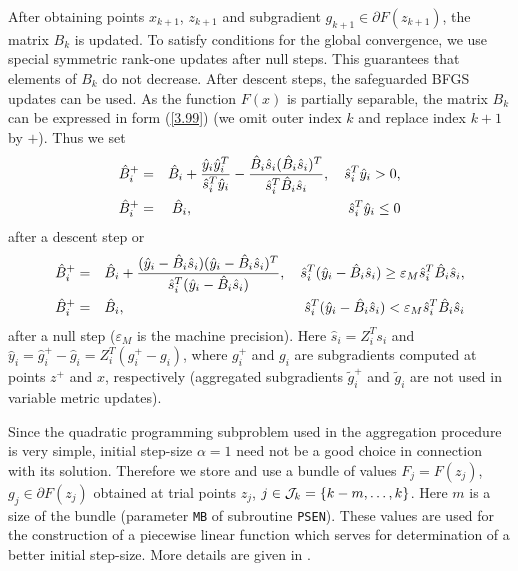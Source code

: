 \documentclass{esub2acm}
\newcommand{\beq}{\begin{eqnarray*}}
\newcommand{\eeq}{\end{eqnarray*}}
\begin{document}
After obtaining points $x_{k+1}$, $z_{k+1}$ and subgradient
$g_{k+1} \in \partial F(z_{k+1})$, the matrix $B_k$ is
updated. To satisfy conditions for the global convergence,
we use special symmetric rank-one updates after null steps.
This guarantees that elements of $B_k$ do not decrease. After
descent steps, the safeguarded BFGS updates can be used.
As the function $F(x)$ is partially separable, the matrix $B_k$
can be expressed in form (\ref{3.99}) (we omit outer
index $k$ and replace index $k+1$ by $+$). Thus we set
%
\beq
\label{4.7} \hat{B}_i^+ & = & \hat{B}_i + \frac{\hat{y}_i \hat{y}_i^T}{\hat{s}_i^T \hat{y}_i} -
\frac{\hat{B}_i \hat{s}_i (\hat{B}_i  \hat{s}_i)^T}{\hat{s}_i^T \hat{B}_i \hat{s}_i},
\quad  \hat{s}_i^T \hat{y}_i > 0, \\
\hat{B}_i^+ & = & \hat{B}_i, \hspace{39mm} \hat{s}_i^T \hat{y}_i \leq 0 \nonumber
\eeq
%
after a descent step or
%
\beq
\label{4.7a}
\hat{B}_i^+ & = & \hat{B}_i + \frac{(\hat{y}_i - \hat{B}_i \hat{s}_i)
(\hat{y}_i - \hat{B}_i \hat{s}_i)^T}{\hat{s}_i^T (\hat{y}_i - \hat{B}_i \hat{s}_i)},
\quad \hat{s}_i^T (\hat{y}_i - \hat{B}_i \hat{s}_i) \geq
\varepsilon_M \hat{s}_i^T \hat{B}_i \hat{s}_i, \\
\hat{B}_i^+ & = & \hat{B}_i, \hspace{45mm} \hat{s}_i^T (\hat{y}_i - \hat{B}_i \hat{s}_i)
<  \varepsilon_M \hat{s}_i^T \hat{B}_i \hat{s}_i \nonumber
\eeq
%
after a null step ($\varepsilon_M$ is the machine precision).
Here $\hat{s}_i = Z_i^T s_i$  and
$\hat{y}_i = \hat{g}_i^+ - \hat{g}_i = Z_i^T (g_i^+ - g_i)$,
where $g_i^+$ and $g_i$ are subgradients computed at points
$z^+$ and $x$, respectively (aggregated subgradients
$\tilde{g}_i^+$ and $\tilde{g}_i$ are not used in variable
metric updates).

Since the quadratic programming subproblem used in the aggregation
procedure is very simple, initial step-size $\alpha = 1$ need
not be a good choice in connection with its solution.
Therefore we store and use a bundle of values $F_j =  F(z_j)$,
$g_j \in \partial F(z_j)$ obtained at trial points $z_j$,
$j \in {\cal J}_k = \{ k-m, \dots, k \}$. Here $m$ is a
size of the bundle (parameter {\tt MB} of subroutine {\tt PSEN}).
These values are used for the construction of a piecewise linear
function which serves for determination of a better initial
step-size. More details are given in \cite{luv5}.

\vspace{8mm}

\end{document}
